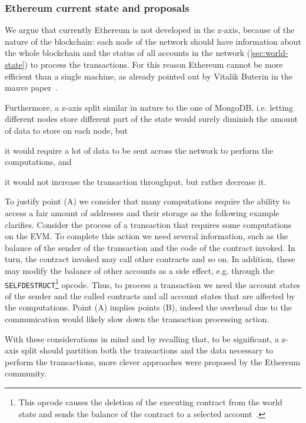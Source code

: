\subsubsection{Ethereum current state and proposals}
We argue that currently Ethereum is not developed in the z-axis, because of the
nature of the blockchain: each node of the network should have information about
the whole blockchain and the status of all accounts in the network
(\autoref{sec:world-state}) to process the transactions. For this reason
Ethereum cannot be more efficient than a single machine, as already pointed out
by Vitalik Buterin in the mauve paper~\cite{bib:mauve}.

Furthermore, a z-axis split similar in nature to the one of MongoDB, i.e.
letting different nodes store different part of the state would surely diminish
the amount of data to store on each node, but
\begin{enumerate*}[label=(\Alph*)]
  \item it would require a lot of data to be sent across the network to perform
  the computations, and
  \item it would not increase the transaction throughput, but rather decrease it.
\end{enumerate*}
To justify point (A) we consider that many computations require the ability to
access a fair amount of addresses and their storage as the following example
clarifies. Consider the process of a transaction that requires some
computations on the EVM. To complete this action we need several information,
such as the balance of the sender of the transaction and the code of the
contract invoked. In turn, the contract invoked may call other contracts and so
on. In addition, these may modify the balance of other accounts as a side
effect, e.g. through the \texttt{SELFDESTRUCT}\footnote{This opcode causes the
deletion of the executing contract from the world state and sends the balance of
the contract to a selected account~\cite{wood2018ethereum}.} opcode. Thus, to
process a transaction we need the account states of the sender and the called
contracts and all account states that are affected by the computations. Point
(A) implies points (B), indeed the overhead due to the communication would
likely slow down the transaction processing action.

With these considerations in mind and by recalling that, to be significant, a
z-axis split should partition both the transactions and the data necessary to
perform the transactions, more clever approaches were proposed by the Ethereum
community.

